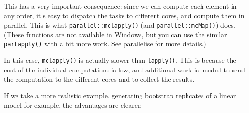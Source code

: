 This has a very important consequence: since we can compute each element
in any order, it's easy to dispatch the tasks to different cores, and
compute them in parallel. This is what \texttt{parallel::mclapply()}
(and \texttt{parallel::mcMap()}) does. (These functions are not
available in Windows, but you can use the similar \texttt{parLapply()}
with a bit more work. See \hyperref[parallelise]{parallelise} for more
details.) 

\begin{Shaded}
\begin{Highlighting}[]
\NormalTok{(}\NormalTok{(}\NormalTok{:} \NormalTok{))}
\end{Highlighting}
\end{Shaded}

In this case, \texttt{mclapply()} is actually slower than
\texttt{lapply()}. This is because the cost of the individual
computations is low, and additional work is needed to send the
computation to the different cores and to collect the results.

If we take a more realistic example, generating bootstrap replicates of
a linear model for example, the advantages are clearer:

\begin{Shaded}
\begin{Highlighting}[]
\StringTok{ }\NormalTok{function(x) x[}\NormalTok{(} \NormalTok{T), ]}
\StringTok{ }
\StringTok{ }
  \NormalTok{(}\StringTok{ }\StringTok{ } 
\NormalTok{\}}

\NormalTok{(}\NormalTok{(}\NormalTok{:}
\NormalTok{(}\NormalTok{(}\NormalTok{:} \NormalTok{))}
\end{Highlighting}
\end{Shaded}

